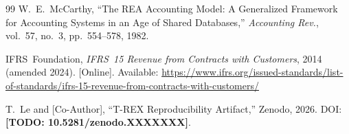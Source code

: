 \documentclass[journal]{IEEEtran}
\newcommand{\TODO}[1]{{\color{red}\textbf{[TODO: #1]}}}
\begin{document}
\begin{thebibliography}{99}
W.~E.~McCarthy, ``The REA Accounting Model: A Generalized Framework for Accounting Systems in an Age of Shared Databases,'' \emph{Accounting Rev.}, vol.~57, no.~3, pp.~554--578, 1982.

IFRS~Foundation, \emph{IFRS~15 Revenue from Contracts with Customers}, 2014 (amended 2024). [Online]. Available: \url{https://www.ifrs.org/issued-standards/list-of-standards/ifrs-15-revenue-from-contracts-with-customers/}

T.~Le and [Co-Author], ``T-REX Reproducibility Artifact,'' Zenodo, 2026. DOI: \TODO{10.5281/zenodo.XXXXXXX}.

\end{thebibliography}

\end{document}
